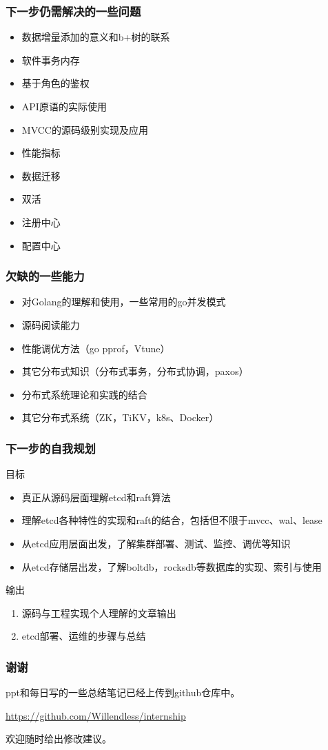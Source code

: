 \documentclass{beamer}
\begin{document}
\begin{frame}
\frametitle{下一步仍需解决的一些问题}

\begin{itemize}
    \item 数据增量添加的意义和b+树的联系
    \item 软件事务内存
    \item 基于角色的鉴权
    \item API原语的实际使用
    \item MVCC的源码级别实现及应用
    \item 性能指标
    \item 数据迁移
    \item 双活
    \item 注册中心
    \item 配置中心
\end{itemize}
\end{frame}

%
%

\begin{frame}
\frametitle{欠缺的一些能力}

\begin{itemize}
    \item 对Golang的理解和使用，一些常用的go并发模式
    \item 源码阅读能力
    \item 性能调优方法（go pprof，Vtune）
    \item 其它分布式知识（分布式事务，分布式协调，paxos）
    \item 分布式系统理论和实践的结合
    \item 其它分布式系统（ZK，TiKV，k8s、Docker）
\end{itemize}

\end{frame}

%
%

\begin{frame}
\frametitle{下一步的自我规划}

目标

\begin{itemize}
    \item 真正从源码层面理解etcd和raft算法
    \item 理解etcd各种特性的实现和raft的结合，包括但不限于mvcc、wal、lease
    \item 从etcd应用层面出发，了解集群部署、测试、监控、调优等知识
    \item 从etcd存储层出发，了解boltdb，rocksdb等数据库的实现、索引与使用
\end{itemize}

输出

\begin{enumerate}
    \item 源码与工程实现个人理解的文章输出
    \item etcd部署、运维的步骤与总结
\end{enumerate}


\end{frame}

%
%

\begin{frame}
\frametitle{谢谢}

ppt和每日写的一些总结笔记已经上传到github仓库中。

\url{https://github.com/Willendless/internship}

欢迎随时给出修改建议。

\end{frame}
\end{document}
